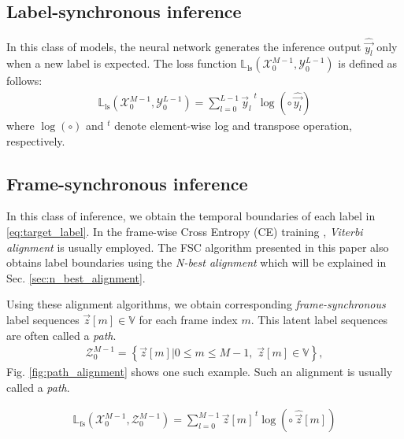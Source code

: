 \documentclass{article}
\begin{document}
\subsection{Label-synchronous inference}
In this class of models, the neural network generates the inference output 
$\widehat{\vec{y_l}}$ 
only when a new label is expected. The loss function 
$\mathbb{L}_{\text{ls}}\left(\mathcal{X}_{0}^{M-1}, \mathcal{Y}_{0}^{L-1}\right)$ is 
defined as follows:
   \begin{align}
     \mathbb{L}_{\text{ls}}\left(\mathcal{X}_{0}^{M-1}, \mathcal{Y}_{0}^{L-1}\right) 
        = \sum_{l=0}^{L-1}  {\vec{y}_l}^{\;t}  \log\left( 
            \circ \, \widehat{\vec{y_l}} \right)  
          \label{eq:label_synchronous_ce_loss} 
   \end{align}
where $\log \left(\circ \right)$ and $^{t}$ denote element-wise log and 
transpose operation, respectively.



\subsection{Frame-synchronous inference}
\label{sec:frame_synchronous_inference}
In this class of inference,  we obtain
the temporal boundaries of each label in \eqref{eq:target_label}.
In the frame-wise Cross Entropy (CE) training 
\cite{g_hinton_ieee_signal_processing_mag_2012_00, 
C_Kim_INTERSPEECH_2017_1, 
B_Li_INTERSPEECH_2017_1}, {\it Viterbi alignment}  
\cite{
x_huang_prentice_hall_2001_00,
l_r_rabiner_proceedings_of_ieee_1989_00} is usually employed. 
The FSC algorithm presented in this paper also obtains
label boundaries using the {\it N-best alignment} which will
be explained in Sec. \ref{sec:n_best_alignment}.

Using these alignment algorithms, 
we obtain corresponding {\it frame-synchronous} label sequences 
$\vec{z}[m] \in \mathbb{V}$ for each frame index $m$. This
latent label sequences are often called a {\it path}.
  \begin{align}
    \mathcal{Z}_{0}^{M-1}  =  
      \left\{\vec{z}[m]  \Big| 0 \le m \le M-1, \; \vec{z}[m] \in \mathbb{V} \right\}, 
    \label{eq:latent_label_seq}
  \end{align}
Fig. \ref{fig:path_alignment} shows one such example. 
Such an alignment is usually called a {\it path}.

\begin{align}
   \mathbb{L}_{\text{fs}}\left(\mathcal{X}_{0}^{M-1}, \mathcal{Z}_{0}^{M-1}\right) 
      = \sum_{l=0}^{M-1}  {\vec{z}[m]}^{\,t}  \log\left( 
          \circ \, \widehat{\vec{z}}[m] \right)  
        \label{eq:frame_synchronous_ce_loss} 
\end{align}
\end{document}
